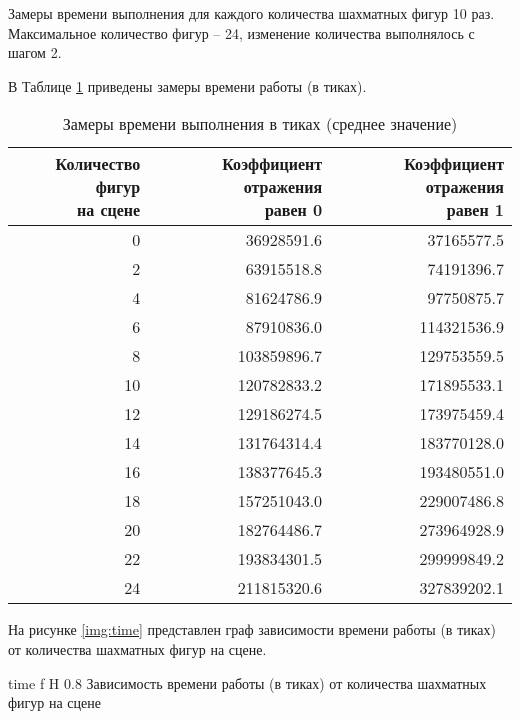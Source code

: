 Замеры времени выполнения для каждого количества шахматных фигур 10 раз. 
Максимальное количество фигур -- 24, изменение количества выполнялось с шагом 2. 

В Таблице \ref{tab:time} приведены замеры времени работы (в тиках).

\begin{table}[H]
	\centering
	\caption{\label{tab:time}Замеры времени выполнения в тиках (среднее значение)}
	\scalebox{0.75}
	{
		\begin{tabular}{|r|r|r|}
			\hline \specialcell{Количество фигур \\ на сцене} & 
			\specialcell{Коэффициент отражения \\ равен 0} &	\specialcell{Коэффициент отражения \\ равен 1} \\\hline
   \num{0} & \num{36928591.6}  & \num{37165577.5}  \\\hline
\num{2} & \num{63915518.8}  & \num{74191396.7}  \\\hline
\num{4} & \num{81624786.9}  & \num{97750875.7}  \\\hline
\num{6} & \num{87910836.0}  & \num{114321536.9}  \\\hline
\num{8} & \num{103859896.7}  & \num{129753559.5}  \\\hline
\num{10} & \num{120782833.2}  & \num{171895533.1}  \\\hline
\num{12} & \num{129186274.5}  & \num{173975459.4}  \\\hline
\num{14} & \num{131764314.4}  & \num{183770128.0}  \\\hline
\num{16} & \num{138377645.3}  & \num{193480551.0}  \\\hline
\num{18} & \num{157251043.0}  & \num{229007486.8}  \\\hline
\num{20} & \num{182764486.7}  & \num{273964928.9}  \\\hline
\num{22} & \num{193834301.5}  & \num{299999849.2}  \\\hline
\num{24} & \num{211815320.6}  & \num{327839202.1}  \\\hline
		\end{tabular}
	}
\end{table}

На рисунке \ref{img:time} представлен граф зависимости времени работы (в тиках) от количества шахматных фигур на сцене.

{time} 
{f} 
{H} 
{0.8\textwidth} 
{Зависимость времени работы (в тиках) от количества шахматных фигур на сцене}

